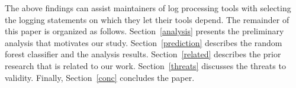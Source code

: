 The above findings can assist maintainers of log processing tools with  selecting the logging statements on which they let their tools depend. %
%
%
%
%
%
%
%
%
% 
The remainder of this paper is organized as follows. Section~\ref{analysis} presents the preliminary analysis that motivates our study. Section~\ref{prediction} describes the random forest classifier and the analysis results. Section~\ref{related} describes the prior research that is related to our work. Section~\ref{threats} discusses the threats to validity. Finally, Section~\ref{conc} concludes the paper.
 
 
